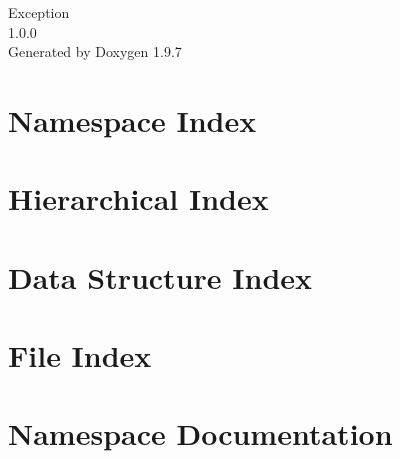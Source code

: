 \documentclass[twoside]{book}
\newcommand{\+}{\discretionary{\mbox{\scriptsize$\hookleftarrow$}}{}{}}
\newcommand{\clearemptydoublepage}{%
    \newpage{\pagestyle{empty}\cleardoublepage}%
  }
\begin{document}
  \raggedbottom
    \hypersetup{pageanchor=false,
                bookmarksnumbered=true,
                pdfencoding=unicode
               }
  \begin{titlepage}
  \vspace*{7cm}
  \begin{center}%
  {\Large Exception}\\
  [1ex]\large 1.\+0.\+0 \\
  \vspace*{1cm}
  {\large Generated by Doxygen 1.9.7}\\
  \end{center}
  \end{titlepage}
  \clearemptydoublepage
  \tableofcontents
  \clearemptydoublepage
  \hypersetup{pageanchor=true}

\chapter{Namespace Index}

\chapter{Hierarchical Index}

\chapter{Data Structure Index}

\chapter{File Index}

\chapter{Namespace Documentation}


\end{document}
